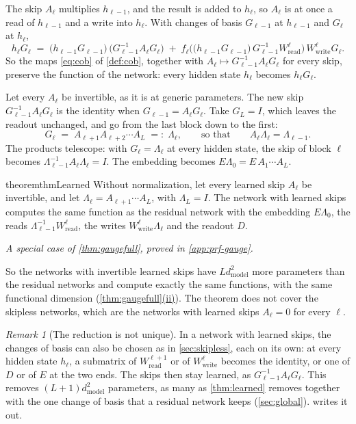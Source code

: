 \documentclass[10pt]{article}
\theoremstyle{definition}
\theoremstyle{remark}
\newtheorem{remark}[theorem]{Remark}
\newcommand{\Wread}{W_{\mathrm{read}}}
\newcommand{\Wwrite}{W_{\mathrm{write}}}
\newcommand{\dm}{d_{\mathrm{model}}}
\DeclareRobustCommand{\cpref}[2]{\hyperref[#1:#2]{\cref*{#1}(#2)}}
\newcommand{\specialof}[2]{\par\vspace{-0.4\baselineskip}\noindent\hfill{\small\itshape A special case of \cref{#1}, proved in \cref{#2}.}\par\smallskip}
\begin{document}
The skip $A_\ell$ multiplies $h_{\ell-1}$, and the result is added to $h_\ell$, so $A_\ell$ is at once a read of $h_{\ell-1}$ and a write into $h_\ell$. With changes of basis $G_{\ell-1}$ at $h_{\ell-1}$ and $G_\ell$ at $h_\ell$,
\begin{equation}\label{eq:skipmap}
h_\ell G_\ell \;=\; \big(h_{\ell-1}G_{\ell-1}\big)\,\big(G_{\ell-1}^{-1}A_\ell G_\ell\big) \;+\; f_\ell\Big(\big(h_{\ell-1}G_{\ell-1}\big)\,G_{\ell-1}^{-1}\Wread^{\ell}\Big)\,\Wwrite^{\ell}G_\ell .
\end{equation}
So the maps \eqref{eq:cob} of \cref{def:cob}, together with $A_\ell \mapsto G_{\ell-1}^{-1}A_\ell G_\ell$ for every skip, preserve the function of the network: every hidden state $h_\ell$ becomes $h_\ell G_\ell$.

Let every $A_\ell$ be invertible, as it is at generic parameters. The new skip $G_{\ell-1}^{-1}A_\ell G_\ell$ is the identity when $G_{\ell-1} = A_\ell G_\ell$. Take $G_L = I$, which leaves the readout unchanged, and go from the last block down to the first:
\begin{equation}\label{eq:sweep}
G_\ell \;=\; A_{\ell+1}A_{\ell+2}\cdots A_L \;=:\; \Lambda_\ell, \qquad\text{so that}\qquad A_\ell\Lambda_\ell = \Lambda_{\ell-1}.
\end{equation}
The products telescope: with $G_\ell = \Lambda_\ell$ at every hidden state, the skip of block $\ell$ becomes $\Lambda_{\ell-1}^{-1}A_\ell\Lambda_\ell = I$. The embedding becomes $E\Lambda_0 = E\,A_1\cdots A_L$.

\begin{restatable}{theorem}{thmLearned}\label{thm:learned}
Without normalization, let every learned skip $A_\ell$ be invertible, and let $\Lambda_\ell = A_{\ell+1}\cdots A_L$, with $\Lambda_L = I$. The network with learned skips computes the same function as the residual network with the embedding $E\Lambda_0$, the reads $\Lambda_{\ell-1}^{-1}\Wread^{\ell}$, the writes $\Wwrite^{\ell}\Lambda_\ell$ and the readout $D$.
\end{restatable}
\specialof{thm:gaugefull}{app:prf-gauge}

So the networks with invertible learned skips have $L\dm^2$ more parameters than the residual networks and compute exactly the same functions, with the same functional dimension (\cpref{thm:gaugefull}{ii}). The theorem does not cover the skipless networks, which are the networks with learned skips $A_\ell = 0$ for every $\ell$.

\begin{remark}[The reduction is not unique]\label{rem:notunique}
In a network with learned skips, the changes of basis can also be chosen as in \cref{sec:skipless}, each on its own: at every hidden state $h_\ell$, a submatrix of $\Wread^{\ell+1}$ or of $\Wwrite^{\ell}$ becomes the identity, or one of $D$ or of $E$ at the two ends. The skips then stay learned, as $G_{\ell-1}^{-1}A_\ell G_\ell$. This removes $(L+1)\dm^2$ parameters, as many as \cref{thm:learned} removes together with the one change of basis that a residual network keeps (\cref{sec:global}).  writes it out.
\end{remark}
\end{document}

